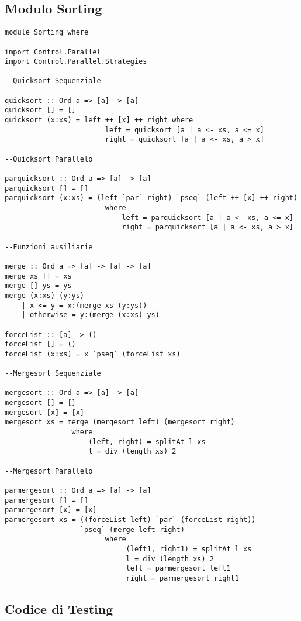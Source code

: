 \subsection{Modulo Sorting}
\begin{verbatim}
module Sorting where

import Control.Parallel
import Control.Parallel.Strategies

--Quicksort Sequenziale

quicksort :: Ord a => [a] -> [a]
quicksort [] = []
quicksort (x:xs) = left ++ [x] ++ right where
                        left = quicksort [a | a <- xs, a <= x]
                        right = quicksort [a | a <- xs, a > x]

--Quicksort Parallelo

parquicksort :: Ord a => [a] -> [a]
parquicksort [] = []
parquicksort (x:xs) = (left `par` right) `pseq` (left ++ [x] ++ right)
                        where
                            left = parquicksort [a | a <- xs, a <= x]
                            right = parquicksort [a | a <- xs, a > x]
                            
--Funzioni ausiliarie

merge :: Ord a => [a] -> [a] -> [a]
merge xs [] = xs
merge [] ys = ys
merge (x:xs) (y:ys)
    | x <= y = x:(merge xs (y:ys))
    | otherwise = y:(merge (x:xs) ys)
    
forceList :: [a] -> ()
forceList [] = ()
forceList (x:xs) = x `pseq` (forceList xs)

--Mergesort Sequenziale

mergesort :: Ord a => [a] -> [a]
mergesort [] = []
mergesort [x] = [x]
mergesort xs = merge (mergesort left) (mergesort right)
                where
                    (left, right) = splitAt l xs
                    l = div (length xs) 2

--Mergesort Parallelo

parmergesort :: Ord a => [a] -> [a]
parmergesort [] = []
parmergesort [x] = [x]
parmergesort xs = ((forceList left) `par` (forceList right))
                  `pseq` (merge left right)
                        where
                             (left1, right1) = splitAt l xs
                             l = div (length xs) 2
                             left = parmergesort left1
                             right = parmergesort right1
\end{verbatim}
\subsection{Codice di Testing}
